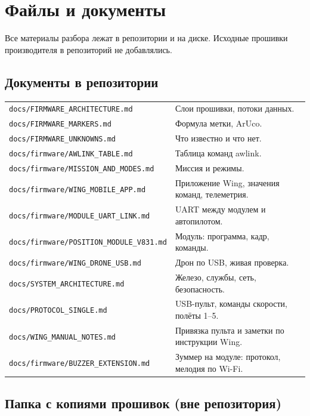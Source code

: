 \chapter{Файлы и документы}

Все материалы разбора лежат в репозитории и на диске. Исходные прошивки производителя в репозиторий не добавлялись.

\section*{Документы в репозитории}

\begin{tabularx}{\textwidth}{@{}p{6.4cm} Y@{}}
\toprule
{} &  \\ \midrule
\texttt{docs/FIRMWARE\_ARCHITECTURE.md} & Слои прошивки, потоки данных. \\
\texttt{docs/FIRMWARE\_MARKERS.md} & Формула метки, ArUco. \\
\texttt{docs/FIRMWARE\_UNKNOWNS.md} & Что известно и что нет. \\
\texttt{docs/firmware/AWLINK\_TABLE.md} & Таблица команд awlink. \\
\texttt{docs/firmware/MISSION\_AND\_MODES.md} & Миссия и режимы. \\
\texttt{docs/firmware/WING\_MOBILE\_APP.md} & Приложение Wing, значения команд, телеметрия. \\
\texttt{docs/firmware/MODULE\_UART\_LINK.md} & UART между модулем и автопилотом. \\
\texttt{docs/firmware/POSITION\_MODULE\_V831.md} & Модуль: программа, кадр, команды. \\
\texttt{docs/firmware/WING\_DRONE\_USB.md} & Дрон по USB, живая проверка. \\
\texttt{docs/SYSTEM\_ARCHITECTURE.md} & Железо, службы, сеть, безопасность. \\
\texttt{docs/PROTOCOL\_SINGLE.md} & USB-пульт, команды скорости, полёты 1--5. \\
\texttt{docs/WING\_MANUAL\_NOTES.md} & Привязка пульта и заметки по инструкции Wing. \\
\texttt{docs/firmware/BUZZER\_EXTENSION.md} & Зуммер на модуле: протокол, мелодия по Wi-Fi. \\ \bottomrule
\end{tabularx}

\section*{Папка с копиями прошивок (вне репозитория)}

